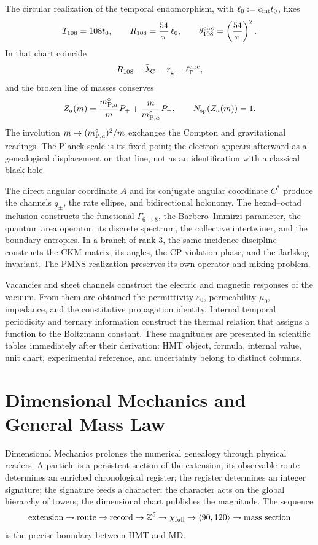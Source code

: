 The circular realization of the temporal endomorphism, with
\(\ell_0:=c_{\rm int}t_0\), fixes
\[
 T_{108}=108t_0,
 \qquad
 R_{108}=\frac{54}{\pi}\,\ell_0,
 \qquad
 \theta_{108}^{\rm circ}=\left(\frac{54}{\pi}\right)^2.
\]
In that chart coincide
\[
 R_{108}=\bar\lambda_{\rm C}=r_{\rm g}=\ell_{\rm P}^{\rm circ},
\]
and the broken line of masses conserves
\[
 Z_a(m)=\frac{m_{{\rm P},a}^{\circ}}mP_+
       +\frac m{m_{{\rm P},a}^{\circ}}P_-,
 \qquad N_{\rm sp}(Z_a(m))=1.
\]
The involution \(m\mapsto(m_{{\rm P},a}^{\circ})^2/m\) exchanges the
Compton and gravitational readings. The Planck scale is its fixed point; the
electron appears afterward as a genealogical displacement on that line, not
as an identification with a classical black hole.

The direct angular coordinate \(A\) and its conjugate angular coordinate
\(C^*\) produce the channels
\(q_\pm\), the rate ellipse, and bidirectional holonomy. The
hexad--octad inclusion constructs the functional \(\Gamma_{6\to8}\), the
Barbero--Immirzi parameter, the quantum area operator, its discrete spectrum, the
collective intertwiner, and the boundary entropies. In a branch of rank \(3\),
the same incidence discipline constructs the CKM matrix, its angles, the
CP-violation phase, and the Jarlskog invariant. The PMNS realization preserves
its own operator and mixing problem.

Vacancies and sheet channels construct the electric and
magnetic responses of the vacuum. From them are obtained the permittivity
\(\varepsilon_0\), permeability \(\mu_0\), impedance, and the constitutive
propagation identity. Internal temporal periodicity and ternary
information construct the thermal relation that assigns a function to the
Boltzmann constant.
These magnitudes are presented in scientific tables immediately after
their derivation: HMT object, formula, internal value, unit chart,
experimental reference, and uncertainty belong to distinct columns.

\section*{Dimensional Mechanics and General Mass Law}

Dimensional Mechanics prolongs the numerical genealogy through physical readers. A particle is a persistent section of the extension; its observable route determines an enriched chronological register; the register determines an integer signature; the signature feeds a character; the character acts on the global hierarchy of towers; the dimensional chart publishes the magnitude. The sequence
\[
 \text{extension}\to\text{route}\to\text{record}\to\mathbb Z^5
 \to\chi_{\rm full}\to\langle90,120\rangle
 \to\text{mass section}
\]
is the precise boundary between HMT and MD.

